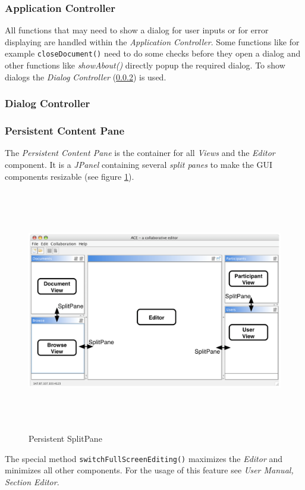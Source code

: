 \subsubsection{Application Controller}
All functions that may need to show a dialog for user inputs or for error displaying are handled within the \textit{Application Controller}. Some functions like for example \texttt{closeDocument()} need to do some checks before they open a dialog and other functions like \textit{showAbout()} directly popup the required dialog. To show dialogs the \textit{Dialog Controller} (\ref{applicationlayer_dialogcontroller}) is used.

\subsubsection{Dialog Controller}
\label{applicationlayer_dialogcontroller}

\subsubsection{Persistent Content Pane}
The \textit{Persistent Content Pane} is the container for all \textit{Views} and the \textit{Editor} component. It is a \textit{JPanel} containing several \textit{split panes} to make the GUI components resizable (see figure \ref{application_splitpane}).
\begin{figure}[H]
\begin{center}
  \includegraphics[height=4.19in, width=6.69in]{../images/finalreport/application_splitpane.eps}
\caption{Persistent SplitPane}
\label{application_splitpane}
\end{center}
\end{figure}
The special method \texttt{switchFullScreenEditing()} maximizes the \textit{Editor} and minimizes all other components. For the usage of this feature see \textit{User Manual, Section Editor}.



